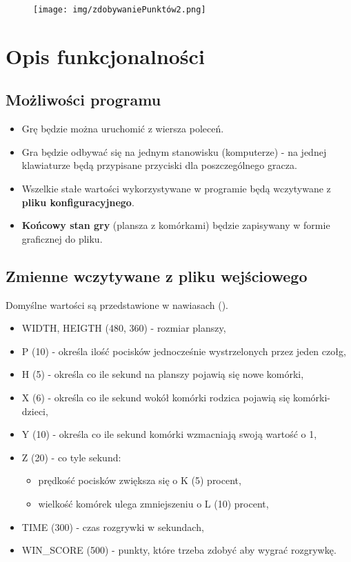 \documentclass{article}
\begin{document}

\begin{figure} [hbt!]
    \texttt{[image: img/zdobywaniePunktów2.png]}
\end{figure}

\clearpage

\section{Opis funkcjonalności}

\subsection{Możliwości programu}
    \begin{itemize}
    
    \item Grę będzie można uruchomić z wiersza poleceń.
    
    \item Gra będzie odbywać się na jednym stanowisku (komputerze) - na jednej klawiaturze będą przypisane przyciski dla poszczególnego gracza.

    \item Wszelkie stałe wartości wykorzystywane w programie będą wczytywane z \textbf{pliku konfiguracyjnego}. 
    
    \item \textbf{Końcowy stan gry} (plansza z komórkami) będzie zapisywany w formie graficznej do pliku.

    \end{itemize}

\subsection{Zmienne wczytywane z pliku wejściowego}
Domyślne wartości są przedstawione w nawiasach ().
\begin{itemize}
    \item WIDTH, HEIGTH (480, 360) - rozmiar planszy,
    \item P (10) - określa ilość pocisków jednocześnie wystrzelonych przez jeden czołg,
    \item H (5) - określa co ile sekund na planszy pojawią się nowe komórki,
    \item X (6) - określa co ile sekund wokół komórki rodzica pojawią się komórki-dzieci,
    \item Y (10) - określa co ile sekund komórki wzmacniają swoją wartość o 1,
    \item Z (20) - co tyle sekund:
        \begin{itemize}
            \item prędkość pocisków zwiększa się o K (5) procent,
            \item wielkość komórek ulega zmniejszeniu o L (10) procent,
        \end{itemize}
    \item TIME (300) - czas rozgrywki w sekundach,
    \item WIN\_SCORE (500) - punkty, które trzeba zdobyć aby wygrać rozgrywkę.
\end{itemize}
\clearpage
\end{document}

